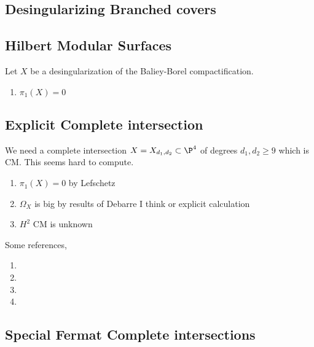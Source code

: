 \documentclass[12pt]{article}
\begin{document}
\subsection{Desingularizing Branched covers}

\subsection{Hilbert Modular Surfaces}

Let $X$ be a desingularization of the Baliey-Borel compactification.

\begin{enumerate}
\item $\pi_1(X) = 0$ 
\end{enumerate}

\subsection{Explicit Complete intersection}

We need a complete intersection $X = X_{d_1, d_2} \subset \P^4$ of degrees $d_1, d_2 \ge 9$ which is CM. This seems hard to compute.

\begin{enumerate}
\item $\pi_1(X) = 0$ by Lefschetz
\item $\Omega_X$ is big by results of Debarre I think or explicit calculation
\item $H^2$ CM is unknown
\end{enumerate}

Some references,
\begin{enumerate}
\item {}

\item {}

\item {}

\item {}
\end{enumerate}

\subsection{Special Fermat Complete intersections}
\end{document}
